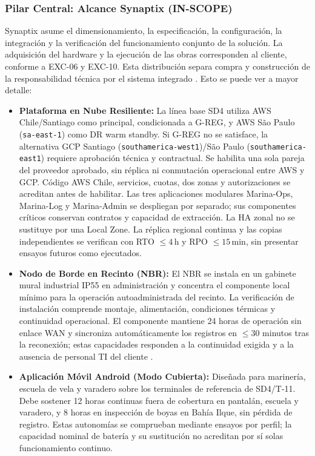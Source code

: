 \subsubsection{Pilar Central: Alcance Synaptix (IN-SCOPE)}
Synaptix asume el dimensionamiento, la especificación, la configuración, la integración y la verificación del funcionamiento conjunto de la solución. La adquisición del hardware y la ejecución de las obras corresponden al cliente, conforme a EXC-06 y EXC-10. Esta distribución separa compra y construcción de la responsabilidad técnica por el sistema integrado \parencite[cap.~11]{caso07}.
Esto se puede ver a mayor detalle:
\begin{itemize}
    \item \textbf{Plataforma en Nube Resiliente:} La línea base SD4 utiliza AWS Chile/Santiago como principal, condicionada a G-REG, y AWS São Paulo (\texttt{sa-east-1}) como DR warm standby. Si G-REG no se satisface, la alternativa GCP Santiago (\texttt{southamerica-west1})/São Paulo (\texttt{southamerica-east1}) requiere aprobación técnica y contractual. Se habilita una sola pareja del proveedor aprobado, sin réplica ni conmutación operacional entre AWS y GCP. Código AWS Chile, servicios, cuotas, dos zonas y autorizaciones se acreditan antes de habilitar. Las tres aplicaciones modulares Marina-Ops, Marina-Log y Marina-Admin se despliegan por separado; sus componentes críticos conservan contratos y capacidad de extracción. La HA zonal no se sustituye por una Local Zone. La réplica regional continua y las copias independientes se verifican con RTO $\le4$\,h y RPO $\le15$\,min, sin presentar ensayos futuros como ejecutados.
    \item \textbf{Nodo de Borde en Recinto (NBR):} El NBR se instala en un gabinete mural industrial IP55 en administración y concentra el componente local mínimo para la operación autoadministrada del recinto. La verificación de instalación comprende montaje, alimentación, condiciones térmicas y continuidad operacional. El componente mantiene 24 horas de operación sin enlace WAN y sincroniza automáticamente los registros en $\le 30$ minutos tras la reconexión; estas capacidades responden a la continuidad exigida y a la ausencia de personal TI del cliente \parencite[cap.~15, RT-03.10, RT-03.13 y RT-06.01]{caso07}.
    \item \textbf{Aplicación Móvil Android (Modo Cubierta):} Diseñada para marinería, escuela de vela y varadero sobre los terminales de referencia de SD4/T-11. Debe sostener 12 horas continuas fuera de cobertura en pantalán, escuela y varadero, y 8 horas en inspección de boyas en Bahía Ilque, sin pérdida de registro. Estas autonomías se comprueban mediante ensayos por perfil; la capacidad nominal de batería y su sustitución no acreditan por sí solas funcionamiento continuo.

\end{itemize}
